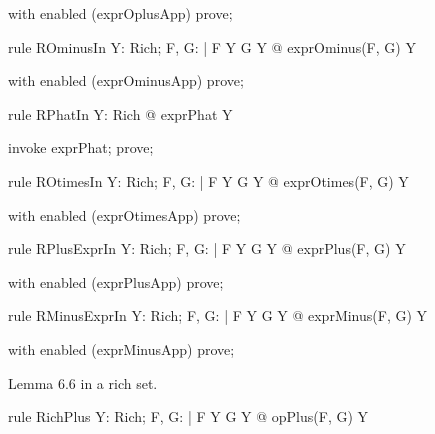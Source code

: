 \documentclass{article}
\begin{document}
\begin{zproof}
with enabled (exprOplusApp) prove;
\end{zproof}

\begin{theorem}{rule ROminusIn}
  \forall Y: Rich; F, G: \nat \fun \nat | F \in Y \land G \in Y @ exprOminus(F, G) \in Y
\end{theorem}

\begin{zproof}
with enabled (exprOminusApp) prove;
\end{zproof}

\begin{theorem}{rule RPhatIn}
  \forall Y: Rich @ exprPhat \in Y
\end{theorem}

\begin{zproof}
invoke exprPhat;
prove;
\end{zproof}

\begin{theorem}{rule ROtimesIn}
  \forall Y: Rich; F, G: \nat \fun \nat | F \in Y \land G \in Y @ exprOtimes(F, G) \in Y
\end{theorem}

\begin{zproof}
with enabled (exprOtimesApp) prove;
\end{zproof}

\begin{theorem}{rule RPlusExprIn}
  \forall Y: Rich; F, G: \nat \fun \nat | F \in Y \land G \in Y @ exprPlus(F, G) \in Y
\end{theorem}

\begin{zproof}
with enabled (exprPlusApp) prove;
\end{zproof}

\begin{theorem}{rule RMinusExprIn}
  \forall Y: Rich; F, G: \nat \fun \nat | F \in Y \land G \in Y @ exprMinus(F, G) \in Y
\end{theorem}

\begin{zproof}
with enabled (exprMinusApp) prove;
\end{zproof}

Lemma 6.6 in a rich set.

\begin{theorem}{rule RichPlus}
  \forall Y: Rich; F, G: \nat \fun \nat | F \in Y \land G \in Y @ opPlus(F, G) \in Y
\end{theorem}
\end{document}
